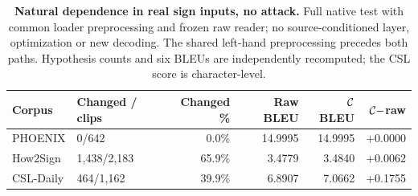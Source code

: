 \begin{table}[t]
\centering\small
\caption{\textbf{Natural dependence in real sign inputs, no attack.} Full native test with common loader preprocessing and frozen raw reader; no source-conditioned layer, optimization or new decoding. The shared left-hand preprocessing precedes both paths. Hypothesis counts and six BLEUs are independently recomputed; the CSL score is character-level.}\label{tab:signnatural}
\begin{tabular}{@{}llrrrr@{}}\toprule
Corpus&Changed / clips&Changed \%&Raw BLEU&$\mathcal{C}$ BLEU&$\mathcal{C}-$raw\\\midrule
PHOENIX&0/642&0.0\%&14.9995&14.9995&+0.0000\\
How2Sign&1,438/2,183&65.9\%&3.4779&3.4840&+0.0062\\
CSL-Daily&464/1,162&39.9\%&6.8907&7.0662&+0.1755\\
\bottomrule\end{tabular}\end{table}
